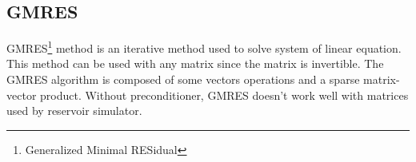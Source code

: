 \subsection{GMRES}
GMRES\footnote{Generalized Minimal RESidual} method is an iterative method used to solve system of linear equation.
%
This method can be used with any matrix since the matrix is invertible.
%
The GMRES algorithm is composed of some vectors operations and a sparse matrix-vector product.
%
Without preconditioner, GMRES doesn't work well with matrices used by reservoir simulator.
